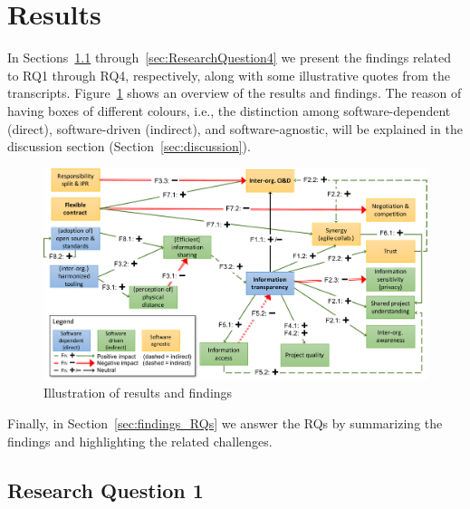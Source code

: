 \section{Results}\label{sec:results}



In Sections~\ref{sec:ResearchQuestion1} through~\ref{sec:ResearchQuestion4} we present the findings related to RQ1 through RQ4, respectively, along with some illustrative quotes from the transcripts. 
Figure~\ref{fig:results} shows an overview of the results and findings. The reason of having boxes of different colours, i.e., the distinction among software-dependent (direct), software-driven (indirect), and software-agnostic, will be explained in the discussion section (Section~\ref{sec:discussion}).

\begin{figure}[htb]
\vspace{-.2cm}
\centering
\includegraphics[width=\textwidth]{figure/results2.pdf}
\vspace{-.6cm}
\caption{Illustration of results and findings}
\label{fig:results}
\vspace{-.2cm}
\end{figure}

Finally, in Section~\ref{sec:findings_RQs} we answer the RQs by summarizing the findings and highlighting the related challenges.

\subsection{Research Question 1}\label{sec:ResearchQuestion1}

